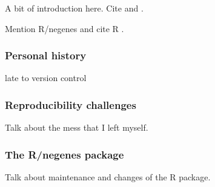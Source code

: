 \begin{quote}
\small
\articleABSTRACT
\end{quote}



A bit of introduction here. Cite \citet{lamichhane2003}
and \citet{blades2002}.

Mention R/negenes \citep{negenes} and cite R \citep{R}.

\subsubsection{Personal history}

late to version control

\subsubsection{Reproducibility challenges}

Talk about the mess that I left myself.

\subsubsection{The R/negenes package}

Talk about maintenance and changes of the R package.
